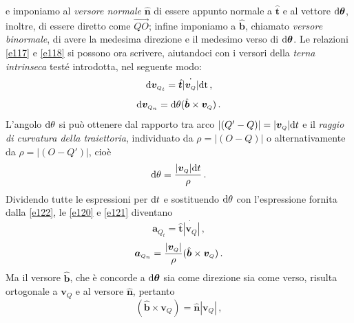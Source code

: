 \noindent e imponiamo al {\em versore normale} $\hat{\bm n}$
di essere appunto normale a $\hat{\bm t}$ e al vettore ${\rm d}{\bm \theta}$, inoltre, di essere
diretto come $\overrightarrow{QO}$;
infine imponiamo a $\hat{\bm b}$, chiamato
{\em versore binormale},
di avere la medesima direzione e il medesimo verso di ${\rm d}{\bm \theta}$.
\noindent Le relazioni \ref{e117} e \ref{e118} si possono ora scrivere, aiutandoci con
i versori della {\em terna intrinseca} test\'e introdotta,
nel seguente modo:
\begin{equation}
{\rm d}{\bm v}_{\scriptscriptstyle{Q}_{\scriptscriptstyle{t}}} = {\hat{\bm t}}
\dot{|{\bm v}_{\scriptscriptstyle{Q}}|}{\rm d t}\,,
	\label{e120}
\end{equation}
\begin{equation}
{\rm d}{\bm v}_{\scriptscriptstyle{Q}_{\scriptscriptstyle{n}}} =
{\rm d}{\theta}
({\hat{{\bm b}}}\times 
{\bm v}_{\scriptscriptstyle{Q}})\,. 
	\label{e121}
\end{equation}
\noindent L'angolo ${\rm d}\theta$ si pu\`o ottenere dal rapporto tra arco
$|(Q'-Q)|=|{\bm v}_{\scriptscriptstyle{Q}}|{\rm d}t$
e il {\em raggio di curvatura della traiettoria}, individuato da $\rho=|(O-Q)|$ o alternativamente
da $\rho=|(O-Q')|$, cio\`e
\begin{equation}
{\rm d}{\theta}=
{|{\bm v}_{\scriptscriptstyle{Q}}|{\rm d}t 
\over{\rho}}\,.
\label{e122}
\end{equation}
\noindent Dividendo tutte le espressioni per ${\rm d}t$ e sostituendo ${\rm d}{\theta}$ con l'espressione fornita dalla
\ref{e122}, le \ref{e120} e \ref{e121} diventano
\begin{equation}
{\bm a}_{\scriptscriptstyle{Q}_{\scriptscriptstyle{t}}}=
{\hat{\bm t}}
\dot{|{\bm v}_{\scriptscriptstyle{Q}}|}\,,
	\label{e123}
\end{equation}
\begin{equation}
{\bm a}_{\scriptscriptstyle{Q}_{\scriptscriptstyle{n}}}=
{|{\bm v}_{\scriptscriptstyle{Q}}| 
\over{\rho}}
({\hat{{\bm b}}}\times 
{\bm v}_{\scriptscriptstyle{Q}})\,. 
	\label{e124}
\end{equation}
\noindent Ma il versore 
${\hat{\bm b}}$, che \`e concorde a ${{\rm d}\bm \theta}$ sia come direzione sia come verso,
risulta ortogonale a ${\bm v}_{\scriptscriptstyle{Q}}$ e al versore
${\hat{\bm n}}$, pertanto 
\begin{equation}
({\hat{{\bm b}}}\times 
{\bm v}_{\scriptscriptstyle{Q}})= 
{\hat{\bm n}}
|{\bm v}_{\scriptscriptstyle{Q}}|\,,
	\label{e125}
\end{equation}
